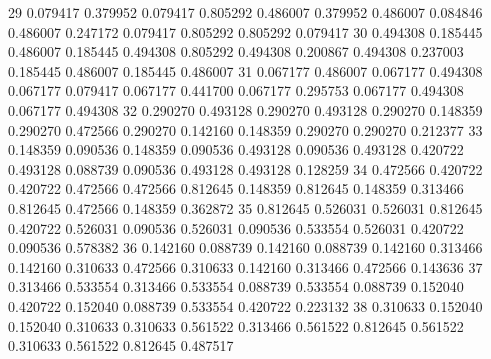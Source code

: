 {   29    0.079417     0.379952    0.079417    0.805292              0.486007             0.379952           0.486007             0.084846                0.486007                0.247172               0.079417              0.805292               0.805292                0.079417
   30    0.494308     0.185445    0.486007    0.185445              0.494308             0.805292           0.494308             0.200867                0.494308                0.237003               0.185445              0.486007               0.185445                0.486007
   31    0.067177     0.486007    0.067177    0.494308              0.067177             0.079417           0.067177             0.441700                0.067177                0.295753               0.067177              0.494308               0.067177                0.494308
   32    0.290270     0.493128    0.290270    0.493128              0.290270             0.148359           0.290270             0.472566                0.290270                0.142160               0.148359              0.290270               0.290270                0.212377
   33    0.148359     0.090536    0.148359    0.090536              0.493128             0.090536           0.493128             0.420722                0.493128                0.088739               0.090536              0.493128               0.493128                0.128259
   34    0.472566     0.420722    0.420722    0.472566              0.472566             0.812645           0.148359             0.812645                0.148359                0.313466               0.812645              0.472566               0.148359                0.362872
   35    0.812645     0.526031    0.526031    0.812645              0.420722             0.526031           0.090536             0.526031                0.090536                0.533554               0.526031              0.420722               0.090536                0.578382
   36    0.142160     0.088739    0.142160    0.088739              0.142160             0.313466           0.142160             0.310633                0.472566                0.310633               0.142160              0.313466               0.472566                0.143636
   37    0.313466     0.533554    0.313466    0.533554              0.088739             0.533554           0.088739             0.152040                0.420722                0.152040               0.088739              0.533554               0.420722                0.223132
   38    0.310633     0.152040    0.152040    0.310633              0.310633             0.561522           0.313466             0.561522                0.812645                0.561522               0.310633              0.561522               0.812645                0.487517
}
